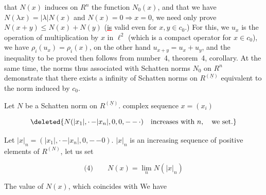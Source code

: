 
\reversemarginpar
{}
\normalmarginpar

that $N(x)$ induces on $R^n$ the function $N_0(x)$, and that we have $N(\lambda x)=|\lambda|N(x)$ and $N(x)=0\Rightarrow x=0$, we need only prove $N(x+y)\leq N(x)+N(y)$ (\textcolor{red}{\uline{\textcolor{black}{is}}} valid even for $x,y\in c_0$.) For this, we  $u_x$ is the operation of multiplication by $x$ in $\ell^2$ (which is a compact operator for $x\in c_0$), we have  $\rho_i(u_x)=\rho_i(x)$, on the other hand  $u_{x+y}=u_x+u_y$, and the inequality to be proved then follows from number~4, theorem~4, corollary. At the same time, the  norms  thus associated with Schatten norms  $N_0$ on $R^n$  demonstrate that there exists a  infinity of Schatten norms on $R^{(\underline N)}$ equivalent to the norm induced by $c_0$.

Let $N$  be a Schatten norm on  $R^{(\underline N)}$.   complex sequence $x=(x_i)$   

\[
\deleted{N(|x_1|,\mathord{\cdot}\,\mathord{-}|x_n|,0,0,\mathord{-}\,\mathord{-}\,\mathord{\cdot})\quad\text{increases with }n,\quad\text{we set.}}
\]

Let $|x|_n=(|x_1|,\mathord{\cdot}\,\mathord{-}|x_n|,0,\mathord{-}\,\mathord{-}0)$.   $|x|_n$ is an increasing sequence of positive elements of $R^{(N)}$, let us set

\[
\text{(4)}\qquad N(x)=\lim_n N(|x|_n)
\]

 The value  of $N(x)$, which coincides with   We have

